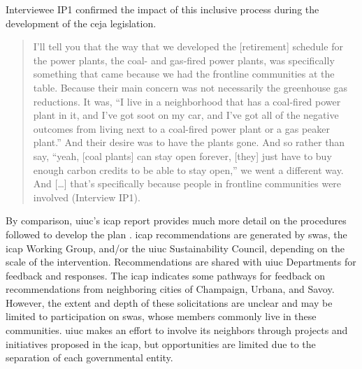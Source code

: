 Interviewee IP1 confirmed the impact of this inclusive process during the
development of the \ac{ceja} legislation.
\begin{quote}
     I'll tell you that the way that we developed the [retirement] schedule for
     the power plants, the coal- and gas-fired power plants, was specifically
     something that came because we had the frontline communities at the table.
     Because their main concern was not necessarily the greenhouse gas
     reductions. It was, ``I live in a neighborhood that has a coal-fired power
     plant in it, and I've got soot on my car, and I've got all of the negative
     outcomes from living next to a coal-fired power plant or a gas peaker
     plant.'' And their desire was to have the plants gone. And so rather than
     say, ``yeah, [coal plants] can stay open forever, [they] just have to buy
     enough carbon credits to be able to stay open,'' we went a different way.
     And [\dots] that's specifically because people in frontline communities
     were involved (Interview IP1).
\end{quote}

By comparison, \ac{uiuc}'s \acf{icap} report provides much more detail on the
procedures followed to develop the plan
\cite{institute_for_sustainability_energy_and_environment_illinois_2020}.
\ac{icap} recommendations are generated by \acp{swa}, the \ac{icap} Working
Group, and/or the \ac{uiuc} Sustainability Council, depending on the scale of
the intervention. Recommendations are shared with \ac{uiuc} Departments for
feedback and responses. The \ac{icap} indicates some pathways for feedback on
recommendations from neighboring cities of Champaign, Urbana, and Savoy.
However, the extent and depth of these solicitations are unclear and may be
limited to participation on \acp{swa}, whose members commonly live in these
communities. \ac{uiuc} makes an effort to involve its neighbors through projects
and initiatives proposed in the \ac{icap}, but opportunities are limited due to
the separation of each governmental entity. 

